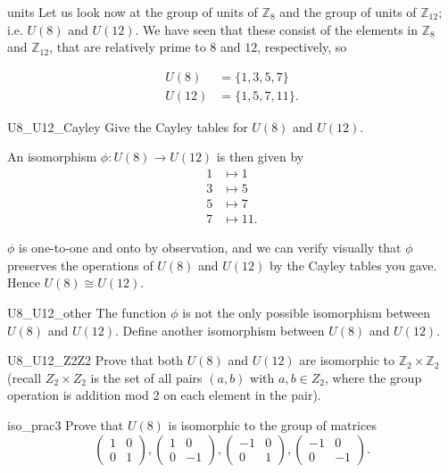 \begin{example}{units}
Let us look now at  the group of units of ${\mathbb Z}_8$ and the group of units of ${\mathbb Z}_{12}$; i.e. $U(8)$ and $U(12)$.  We have seen that these  consist of the elements in ${\mathbb Z}_8$ and ${\mathbb Z}_{12}$, that are relatively prime to $8$ and $12$, respectively, so

\begin{align*}
U(8) & = \{1, 3, 5, 7 \} \\
U(12) & = \{1, 5, 7, 11 \}.
\end{align*}

\begin{exercise}{U8_U12_Cayley}
Give the Cayley tables for $U(8)$ and $U(12)$.
\end{exercise}

An isomorphism $\phi : U(8) \rightarrow U(12)$ is then given by
\begin{align*}
1 & \mapsto  1 \\
3 & \mapsto  5 \\
5 & \mapsto  7 \\
7 & \mapsto  11.
\end{align*}

$\phi$ is one-to-one and onto by observation, and we can verify visually that $\phi$ preserves the operations of $U(8)$ and $U(12)$ by the Cayley tables you gave.  Hence $U(8) \cong U(12)$.
\end{example}

\begin{exercise}{U8_U12_other}
The function $\phi$ is not the only possible isomorphism between $U(8)$ and $U(12)$.  Define another isomorphism between $U(8)$ and $U(12)$.
\end{exercise}

\begin{exercise}{U8_U12_Z2Z2}
Prove that both $U(8)$ and $U(12)$ are isomorphic to ${\mathbb Z}_2 \times {\mathbb Z}_2$ (recall $Z_2 \times Z_2$ is the set of all pairs $(a,b)$ with $a,b \in Z_2$, where 
the group operation is addition mod 2 on each element in the pair). 
\end{exercise}

 \begin{exercise}{iso_prac3}
Prove that $U(8)$ is isomorphic to the group of matrices
\[
\begin{pmatrix}
1 & 0 \\
0 & 1
\end{pmatrix},
\begin{pmatrix}
1 & 0 \\
0 & -1
\end{pmatrix},
\begin{pmatrix}
-1 & 0 \\
0 & 1
\end{pmatrix},
\begin{pmatrix}
-1 & 0 \\
0 & -1
\end{pmatrix}.
\]
\end{exercise} 

